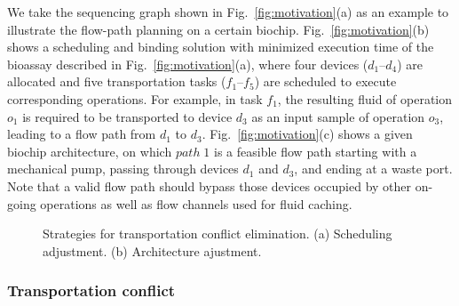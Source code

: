 We take the sequencing graph shown in Fig.~\ref{fig:motivation}(a) as an example to illustrate the flow-path planning on a certain biochip. Fig.~\ref{fig:motivation}(b) shows a scheduling and binding solution with minimized execution time of the bioassay described in Fig.~\ref{fig:motivation}(a), where four devices ($d_1$--$d_4$) are allocated and five transportation tasks ($f_1$--$f_5$) are scheduled to execute corresponding operations. For example, in task $f_1$, the resulting fluid of operation $o_1$ is required to be transported to device $d_3$ as an input sample of operation $o_3$, leading to a flow path from $d_1$ to $d_3$. Fig.~\ref{fig:motivation}(c) shows a given biochip architecture, on which $path\;1$ is a feasible flow path starting with a mechanical pump, passing through devices $d_1$ and $d_3$, and ending at a waste port. Note that a valid flow path should bypass those devices  occupied by other on-going operations as well as flow channels used for fluid caching.

\begin{figure}[t]
    \centering
    \label{ta1}
    \label{tb1}
	  \caption{Strategies for transportation conflict elimination. (a) Scheduling adjustment. (b) Architecture ajustment.}
	  \label{fig:strategy}
\end{figure}

\subsubsection{Transportation conflict}


